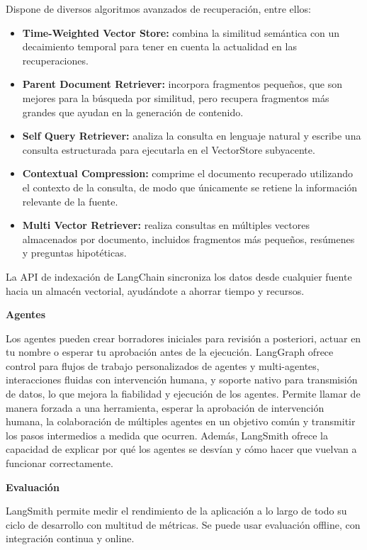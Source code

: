 Dispone de diversos algoritmos avanzados de recuperación, entre ellos:

\begin{itemize}
    \item \textbf{Time-Weighted Vector Store:} combina la similitud semántica con un decaimiento temporal para tener en cuenta la actualidad en las recuperaciones.
    \item \textbf{Parent Document Retriever:} incorpora fragmentos pequeños, que son mejores para la búsqueda por similitud, pero recupera fragmentos más grandes que ayudan en la generación de contenido.
    \item \textbf{Self Query Retriever:} analiza la consulta en lenguaje natural y escribe una consulta estructurada para ejecutarla en el VectorStore subyacente.
    \item \textbf{Contextual Compression:} comprime el documento recuperado utilizando el contexto de la consulta, de modo que únicamente se retiene la información relevante de la fuente.
    \item \textbf{Multi Vector Retriever:} realiza consultas en múltiples vectores almacenados por documento, incluidos fragmentos más pequeños, resúmenes y preguntas hipotéticas.
\end{itemize}

La API de indexación de LangChain sincroniza los datos desde cualquier fuente hacia un almacén vectorial, ayudándote a ahorrar tiempo y recursos. \cite{PaginaLangChainOficialRAG} \cite{mavroudis2024langchain}

\textbf{Agentes}

Los agentes pueden crear borradores iniciales para revisión a posteriori, actuar en tu nombre o esperar tu aprobación antes de la ejecución. LangGraph ofrece control para flujos de trabajo personalizados de agentes y multi-agentes, interacciones fluidas con intervención humana, y soporte nativo para transmisión de datos, lo que mejora la fiabilidad y ejecución de los agentes. Permite llamar de manera forzada a una herramienta, esperar la aprobación de intervención humana, la colaboración de múltiples agentes en un objetivo común y transmitir los pasos intermedios a medida que ocurren. Además, LangSmith ofrece la capacidad de explicar por qué los agentes se desvían y cómo hacer que vuelvan a funcionar correctamente. \cite{PaginaLangChainOficialAgentes} \cite{mavroudis2024langchain}

\textbf{Evaluación}

LangSmith permite medir el rendimiento de la aplicación a lo largo de todo su ciclo de desarrollo con multitud de métricas. Se puede usar evaluación offline, con integración continua y online.

